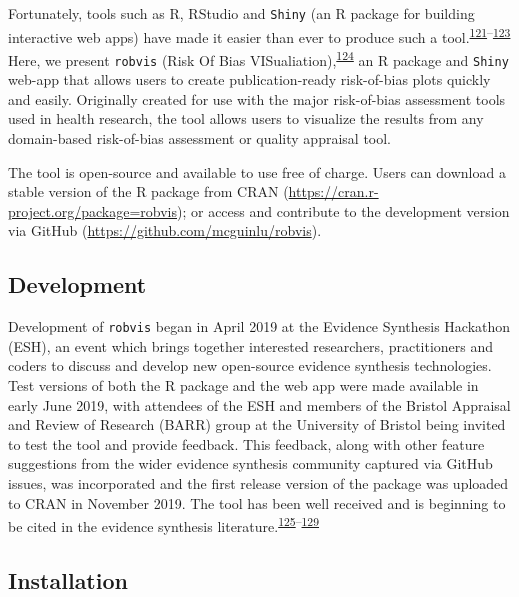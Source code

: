 \documentclass[a4paper, twoside]{templates/ociamthesis}
\begin{document}
Fortunately, tools such as R, RStudio and \texttt{Shiny} (an R package for building interactive web apps) have made it easier than ever to produce such a tool.\textsuperscript{\protect\hyperlink{ref-rref}{121}--\protect\hyperlink{ref-shinyref}{123}} Here, we present \texttt{robvis} (Risk Of Bias VISualiation),\textsuperscript{\protect\hyperlink{ref-mcguinness2019a}{124}} an R package and \texttt{Shiny} web-app that allows users to create publication-ready risk-of-bias plots quickly and easily. Originally created for use with the major risk-of-bias assessment tools used in health research, the tool allows users to visualize the results from any domain-based risk-of-bias assessment or quality appraisal tool.

The tool is open-source and available to use free of charge. Users can download a stable version of the R package from CRAN (\url{https://cran.r-project.org/package=robvis}); or access and contribute to the development version via GitHub (\url{https://github.com/mcguinlu/robvis}).

\hypertarget{development-1}{%
\subsection{Development}\label{development-1}}

Development of \texttt{robvis} began in April 2019 at the Evidence Synthesis Hackathon (ESH), an event which brings together interested researchers, practitioners and coders to discuss and develop new open-source evidence synthesis technologies. Test versions of both the R package and the web app were made available in early June 2019, with attendees of the ESH and members of the Bristol Appraisal and Review of Research (BARR) group at the University of Bristol being invited to test the tool and provide feedback. This feedback, along with other feature suggestions from the wider evidence synthesis community captured via GitHub issues, was incorporated and the first release version of the package was uploaded to CRAN in November 2019. The tool has been well received and is beginning to be cited in the evidence synthesis literature.\textsuperscript{\protect\hyperlink{ref-gibb2019consistent}{125}--\protect\hyperlink{ref-tanneru2020}{129}}

\hypertarget{installation-1}{%
\subsection{Installation}\label{installation-1}}
\end{document}
